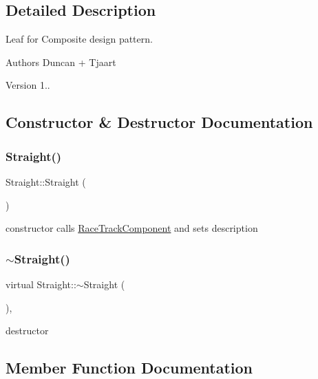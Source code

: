 \subsection{Detailed Description}
Leaf for Composite design pattern. 

\begin{DoxyAuthor}{Authors}
Duncan + Tjaart 
\end{DoxyAuthor}
\begin{DoxyVersion}{Version}
1.. 
\end{DoxyVersion}


\subsection{Constructor \& Destructor Documentation}
\mbox{\label{class_straight_a4a1633c9f829c817c9b598ec4dd835b0}} 
\subsubsection{\texorpdfstring{Straight()}{Straight()}}
{\footnotesize\ttfamily Straight\+::\+Straight (\begin{DoxyParamCaption}{ }\end{DoxyParamCaption})\hspace{0.3cm}{\ttfamily [inline]}}

constructor calls \mbox{\hyperlink{class_race_track_component}{Race\+Track\+Component}} and sets description \mbox{\label{class_straight_ac0b30476ec27b8a8eeb20f3d1ef0dc13}} 
\subsubsection{\texorpdfstring{$\sim$\+Straight()}{~Straight()}}
{\footnotesize\ttfamily virtual Straight\+::$\sim$\+Straight (\begin{DoxyParamCaption}{ }\end{DoxyParamCaption})\hspace{0.3cm}{\ttfamily [inline]}, {\ttfamily [virtual]}}

destructor 

\subsection{Member Function Documentation}
\mbox{\label{class_straight_a8f71b6f1bcf39a5aa79efdfe0c432d1e}} 

